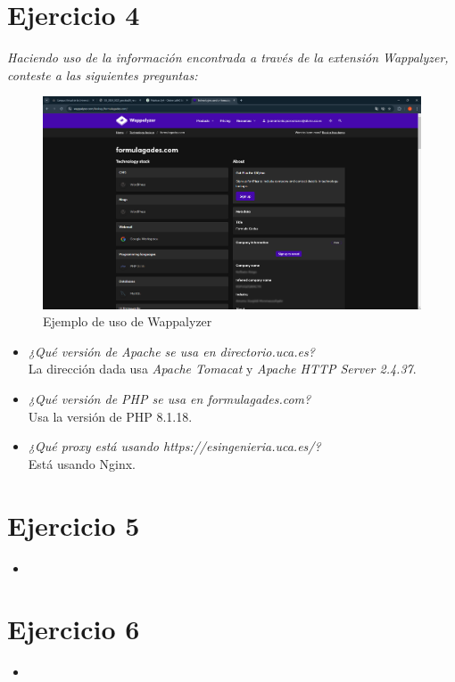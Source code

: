 \documentclass[12pt]{book}
\begin{document}
\section{Ejercicio 4}
\textit{Haciendo uso de la información encontrada a través de la extensión Wappalyzer,
conteste a las siguientes preguntas:}\\

    \begin{figure}[h]
        \centering
        \includegraphics[width=0.5\linewidth]{Practica 3y4/images/Captura de pantalla 2024-10-31 112257.png}
        \caption{Ejemplo de uso de Wappalyzer}
        \label{fig:enter-label}
    \end{figure}
    
    \begin{itemize}
        \item \textit{¿Qué versión de Apache se usa en directorio.uca.es?}\\
            La dirección dada usa \textit{Apache Tomacat} y \textit{Apache HTTP Server 2.4.37}.
        \item \textit{¿Qué versión de PHP se usa en formulagades.com?}\\
            Usa la versión de PHP 8.1.18.
        \item \textit{¿Qué proxy está usando https://esingenieria.uca.es/?}\\
            Está usando Nginx.
    \end{itemize}
\newpage
\section{Ejercicio 5}
\textit{}
\begin{itemize}
    \item 
\end{itemize}
\newpage
\section{Ejercicio 6}
\textit{}
\begin{itemize}
    \item 
\end{itemize}
\newpage
\end{document}
